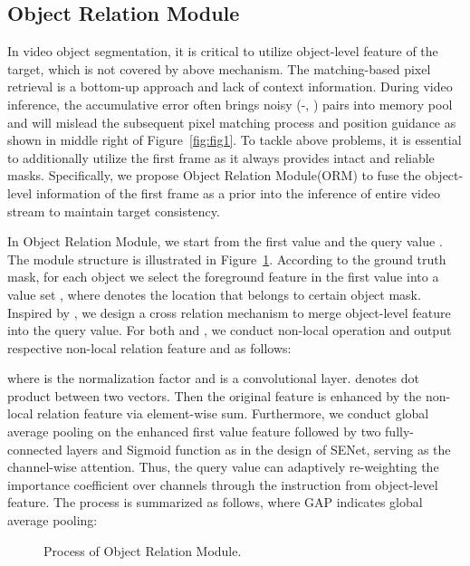 \documentclass[final]{cvpr}
\begin{document}
\subsection{Object Relation Module}\label{sec:PRM}
In video object segmentation, it is critical to utilize object-level feature of the target, which is not covered by above mechanism. The matching-based pixel retrieval is a bottom-up approach and lack of context information. During video inference, the accumulative error often brings noisy (-, ) pairs into memory pool and will mislead the subsequent pixel matching process and position guidance as shown in middle right of Figure~\ref{fig:fig1}. To tackle above problems, it is essential to additionally utilize the first frame as it always provides intact and reliable masks. Specifically, we propose Object Relation Module(ORM) to fuse the object-level information of the first frame as a prior into the inference of entire video stream to maintain target consistency.




In Object Relation Module, we start from the first value  and the query value . The module structure is illustrated in Figure~\ref{fig:prior}. According to the ground truth mask, for each object we select the foreground feature in the first value  into a value set , where  denotes the location that belongs to certain object mask. Inspired by \cite{hsieh2019one}, we design a cross relation mechanism to merge object-level feature into the query value. For both  and , we conduct non-local operation and output respective non-local relation feature  and  as follows:


where  is the normalization factor and  is a  convolutional layer.  denotes dot product between two vectors. Then the original feature is enhanced by the non-local relation feature via element-wise sum.
Furthermore, we conduct global average pooling on the enhanced first value feature followed by two fully-connected layers and Sigmoid function as in the design of SENet\cite{senet}, serving as the channel-wise attention. Thus, the query value can adaptively re-weighting the importance coefficient over channels through the instruction from object-level feature. The process is summarized as follows, where GAP indicates global average pooling:




\begin{figure}[!t]
\begin{center}
	\setlength{\fboxrule}{0pt}
\end{center}
\caption{Process of Object Relation Module.}
\label{fig:prior}
\end{figure}
\end{document}
